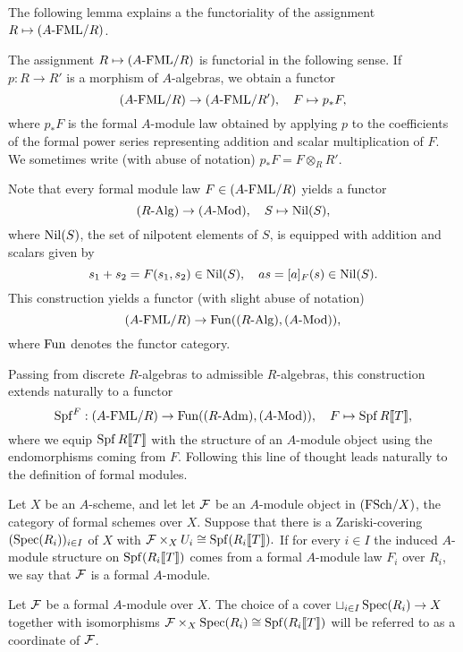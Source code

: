 \documentclass[../main.tex]{subfiles}
\begin{document}
The following lemma explains a the functoriality of the assignment
$R \mapsto {({A}\text-\mathrm{FML}/{R})}$.

\begin{lem}\label{lem:FMLFunc}
  The assignment $R \mapsto {({A}\text-\mathrm{FML}/{R})}$ is functorial in the following sense.
  If $p: R \to R'$ is a morphism of $A$-algebras, we obtain a functor
  \begin{equation*}
    {({A}\text-\mathrm{FML}/{R})} \to {({A}\text-\mathrm{FML}/{R'})}, \quad F \mapsto p_*F,
  \end{equation*}
  where $p_*F$ is the formal $A$-module law obtained by applying $p$ to the
  coefficients of the formal power series representing addition
  and scalar multiplication of $F$. We sometimes write
  (with abuse of notation) $p_* F = F \otimes_R R'$. 
\end{lem}

Note that every formal module law $F \in {({A}\text-\mathrm{FML}/{R})}$ yields a functor
\begin{equation}\label{eq:fmnilpfunc}
  {({R}\text-\mathrm{Alg})} \to {({A}\text-\mathrm{Mod})}, \quad S \mapsto {\operatorname{Nil}}(S),
\end{equation}
where ${\operatorname{Nil}}(S)$, the set of nilpotent elements of $S$, is equipped with
addition and scalars given by 
\begin{equation*}
  s_1 + s_2 = F(s_1, s_2) \in {\operatorname{Nil}}(S), \quad a s = [a]_F(s) \in {\operatorname{Nil}}(S).
\end{equation*}
This construction yields a functor (with slight abuse of notation)
\begin{equation}\label{eq:formfunc}
  {({A}\text-\mathrm{FML}/{R})} \to \operatorname{Fun}({({R}\text-\mathrm{Alg})}, {({A}\text-\mathrm{Mod})}),
\end{equation}
where $\operatorname{Fun}$ denotes the functor category.

Passing from discrete $R$-algebras to admissible $R$-algebras, this construction extends
naturally to a functor 
\begin{equation*}
  \operatorname{Spf}^F: {({A}\text-\mathrm{FML}/{R})} \to \operatorname{Fun} ({({R}\text-\mathrm{Adm})}, {({A}\text-\mathrm{Mod})}), \quad F \mapsto \operatorname{Spf} R\llbracket T \rrbracket,
\end{equation*}
where we equip $\operatorname{Spf} R \llbracket T \rrbracket$ with the structure of an $A$-module object
using the endomorphisms coming from $F$. 
Following this line of thought leads naturally to the definition of
formal modules. 

\begin{defi}
  Let $X$ be an $A$-scheme, and let 
  let $\mathcal{F}$ be an $A$-module object in ${(\mathrm{FSch}/{X})}$, the category of formal
  schemes over $X$. Suppose that there is a Zariski-covering
  $(\operatorname{Spec}(R_i))_{i \in I}$ of $X$ with $\mathcal{F} \times_{X} U_i \cong
  \operatorname{Spf}(R_i\llbracket T \rrbracket).$ If for every $i\in I$ the induced $A$-module
  structure on $\operatorname{Spf}(R_i\llbracket T \rrbracket)$ comes from a formal $A$-module law
  $F_i$ over $R_i$, we say that $\mathcal{F}$ is a formal $A$-module. 
\end{defi}
\begin{defi}[Coordinate]
  Let $\mathcal{F}$ be a formal $A$-module over $X$. The choice of a cover $\sqcup_{i
  \in I} \operatorname{Spec}(R_i) \to X$ together with isomorphisms $\mathcal{F} \times_X \operatorname{Spec}(R_i)
  \cong \operatorname{Spf}(R_i\llbracket T \rrbracket)$ will be referred to as a coordinate of $\mathcal{F}$. 
\end{defi}
\end{document}
